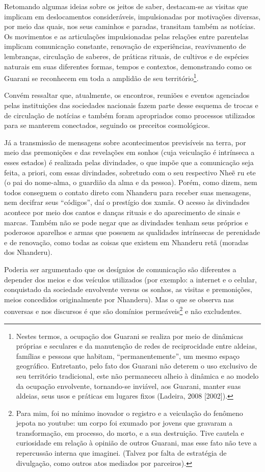 {{Retomando algumas ideias sobre os jeitos de saber, destacam-se as
visitas que implicam em deslocamentos consideráveis, impulsionadas por
motivações diversas, por meio das quais, nos seus caminhos e paradas,
transitam também as notícias. Os movimentos e as articulações
impulsionadas pelas relações entre parentelas implicam comunicação
constante, renovação de experiências, reavivamento de lembranças,
circulação de saberes, de práticas rituais, de cultivos e de espécies
naturais em suas diferentes formas, tempos e contextos, demonstrando
como os Guarani se reconhecem em toda a amplidão de seu
território\footnote{Nestes termos, a ocupação dos Guarani se realiza
por meio de dinâmicas próprias e seculares e da manutenção de redes de
reciprocidade entre aldeias, famílias e pessoas que habitam,
``permanentemente'', um mesmo espaço geográfico. Entretanto, pelo fato
dos Guarani não deterem o uso exclusivo de seu território tradicional,
este não permaneceu alheio à dinâmica e ao modelo da ocupação
envolvente, tornando-se inviável, aos Guarani, manter suas aldeias,
seus usos e práticas em lugares fixos (Ladeira, 2008 [2002]). }. 

Convém ressaltar que, atualmente, os encontros, reuniões e eventos
agenciados pelas instituições das sociedades nacionais fazem parte
desse esquema de trocas e de circulação de notícias e também foram
apropriados como processos utilizados para se manterem conectados,
seguindo os preceitos cosmológicos.

Já a transmissão de mensagens sobre acontecimentos previsíveis na terra,
por meio das premonições e das revelações em sonhos (cuja veiculação é
intrínseca a esses estados) é realizada pelas divindades, o que impõe
que a comunicação seja feita, a priori, com essas divindades, sobretudo
com o seu respectivo Nheẽ ru ete (o pai do nome-alma, o guardião
da alma e da pessoa). Porém, como dizem, nem todos conseguem o contato
direto com Nhanderu para receber suas mensagens, nem decifrar seus
``códigos'', daí o prestígio dos xamãs. O acesso às divindades acontece
por meio dos cantos e danças rituais e do aparecimento de sinais e
marcas. Também não se pode negar que as divindades tenham seus próprios
e poderosos aparelhos e armas que possuem as qualidades intrínsecas de
perenidade e de renovação, como todas as coisas que existem em Nhanderu
retã (moradas dos Nhanderu). 

Poderia ser argumentado que os desígnios de comunicação são diferentes a
depender dos meios e dos veículos utilizados (por exemplo: a internet e
o celular, conquistado da sociedade envolvente versus os sonhos, as
visitas e premonições, meios concedidos originalmente por Nhanderu).
Mas o que se observa nas conversas e nos discursos é que são domínios
permeáveis\footnote{Para mim, foi no mínimo inovador o registro e a
veiculação do fenômeno  jepota no youtube: um corpo foi exumado por
jovens que gravaram a transformação, em processo, do morto, e a sua
destruição. Tive cautela e curiosidade em relação à opinião de outros
Guarani, mas esse fato não teve a repercussão interna que imaginei.
(Talvez por falta de estratégia de divulgação, como outros atos
mediados por parceiros).} e não excludentes.

}}
